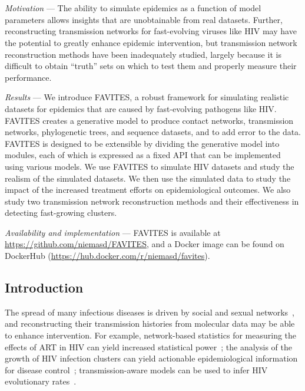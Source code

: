 \newcommand{\EART}{$\mathbb{E}_{ART}$}
\newcommand{\ED}{$\mathbb{E}_d$}

\chapter{\favitestitle}
\label{chap:favites}
\clearpage

\textit{Motivation} --- The ability to simulate epidemics as a function of model parameters allows insights that are unobtainable from real datasets. Further, reconstructing transmission networks for fast-evolving viruses like \gls{HIV} may have the potential to greatly enhance epidemic intervention, but transmission network reconstruction methods have been inadequately studied, largely because it is difficult to obtain ``truth'' sets on which to test them and properly measure their performance.

\textit{Results} --- We introduce FAVITES, a robust framework for simulating realistic datasets for epidemics that are caused by fast-evolving pathogens like \gls{HIV}. FAVITES creates a generative model to produce contact networks, transmission networks, phylogenetic trees, and sequence datasets, and to add error to the data. FAVITES is designed to be extensible by dividing the generative model into modules, each of which is expressed as a fixed \gls{API} that can be implemented using various models. We use FAVITES to simulate \gls{HIV} datasets and study the realism of the simulated datasets. We then use the simulated data to study the impact of the increased treatment efforts on epidemiological outcomes. We also study two transmission network reconstruction methods and their effectiveness in detecting fast-growing clusters.

\textit{Availability and implementation} --- FAVITES is available at \url{https://github.com/niemasd/FAVITES}, and a Docker image  can be found on DockerHub (\url{https://hub.docker.com/r/niemasd/favites}).

\section{Introduction}
The spread of many infectious diseases is driven by social and sexual networks~\cite{Kelly1991}, and reconstructing their transmission histories from molecular data may be able to enhance intervention. For example, network-based statistics for measuring the effects of \gls{ART} in \gls{HIV} can yield increased statistical power~\cite{Wertheim2011}; the analysis of the growth of \gls{HIV} infection clusters can yield actionable epidemiological information for disease control~\cite{Lewis2008}; transmission-aware models can be used to infer \gls{HIV} evolutionary rates~\cite{Vrancken2014}.

